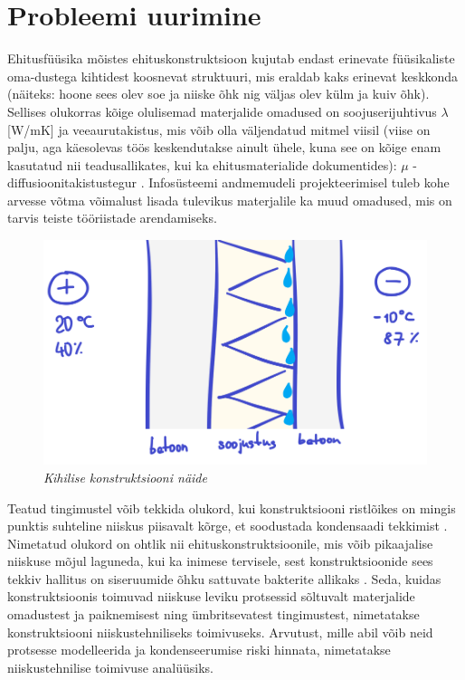 \section{Probleemi uurimine}
\label{chapters:problem_statement_research}

Ehitusfüüsika mõistes ehituskonstruktsioon kujutab endast erinevate füüsikaliste oma-dustega kihtidest 
koosnevat struktuuri, mis eraldab kaks erinevat keskkonda (näiteks: hoone sees olev soe ja niiske õhk nig väljas olev külm ja kuiv õhk).
Sellises olukorras kõige olulisemad materjalide omadused on soojuserijuhtivus \begin{math}\lambda\end{math} [W/mK]
ja veeaurutakistus, mis võib olla väljendatud mitmel viisil (viise on palju, aga käesolevas töös keskendutakse 
ainult ühele, kuna see on kõige enam kasutatud nii teadusallikates, kui ka ehitusmaterialide dokumentides):
\begin{math}\mu\end{math} - diffusioonitakistustegur \cite{building_physics_abc}. Infosüsteemi andmemudeli projekteerimisel tuleb kohe arvesse võtma
võimalust lisada tulevikus materjalile ka muud omadused, mis on tarvis teiste tööriistade arendamiseks.

\begin{figure}[ht]
    \centering
    \includegraphics[width=.6\textwidth]{figures/problem_statement/07_layered_structure_sample.png}
    \caption[Mitmest kihist koosneva ehituskonstruktsiooni näide]{\textit{Kihilise konstruktsiooni näide}}
    \label{fig:construction_sample}
\end{figure}

Teatud tingimustel võib tekkida olukord, kui konstruktsiooni ristlõikes on mingis punktis suhteline niiskus
piisavalt kõrge, et soodustada kondensaadi tekkimist \cite{building_physics_abc}. Nimetatud olukord on ohtlik
nii ehituskonstruktsioonile, mis võib pikaajalise niiskuse mõjul laguneda, kui ka inimese tervisele, sest konstruktsioonide
sees tekkiv hallitus on siseruumide õhku sattuvate bakterite allikaks  \cite{building_physics_abc}. 
Seda, kuidas konstruktsioonis toimuvad niiskuse leviku protsessid sõltuvalt materjalide omadustest ja 
paiknemisest ning ümbritsevatest tingimustest, nimetatakse konstruktsiooni niiskustehniliseks toimivuseks. Arvutust,
mille abil võib neid protsesse modelleerida ja kondenseerumise riski hinnata, nimetatakse niiskustehnilise toimivuse
analüüsiks.

